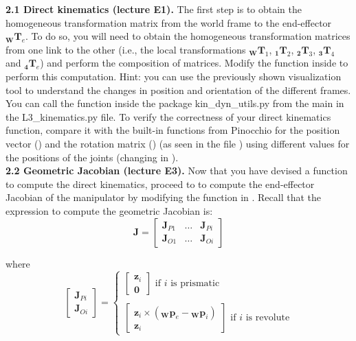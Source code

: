 \documentclass[11pt]{article}
\newcommand{\prepos}[3]{${}_{\mathbf{#2}}{\mathbf{#1}}_{#3}$}
\newcommand{\preposm}[3]{{}_{\mathbf{#2}}{\mathbf{#1}}_{#3}}
\begin{document}
\textbf{2.1 Direct kinematics (lecture E1).} The first step is to obtain the homogeneous transformation matrix from the world frame to the end-effector \prepos{T}{W}{e}. To do so, you will need to obtain the homogeneous transformation matrices from one link to the other (i.e., the local transformations \prepos{T}{W}{1}, \prepos{T}{1}{2}, \prepos{T}{2}{3}, \prepos{T}{3}{4} and \prepos{T}{4}{e}) and perform the composition of matrices. Modify the function  inside  to perform this computation. Hint: you can use the previously shown visualization tool to understand the changes in position and orientation of the different frames. You can call the function inside the package kin\_dyn\_utils.py from the main in the L3\_kinematics.py file. To verify the correctness of your direct kinematics function, compare it with the built-in functions from Pinocchio for the position vector () and the rotation matrix () (as seen in the file ) using different values for the positions of the joints (changing  in ).\\




\textbf{2.2 Geometric Jacobian (lecture E3).} Now that you have devised a function to compute the direct kinematics, proceed to to compute the end-effector Jacobian of the manipulator by modifying the function  in . Recall that the expression to compute the geometric Jacobian is:
\begin{equation*}
	\mathbf{J} = \begin{bmatrix}
		\mathbf{J}_{P1} & \dots & \mathbf{J}_{Pi} \\
		\mathbf{J}_{O1} & \dots & \mathbf{J}_{Oi}
	\end{bmatrix}
\end{equation*}

where
\begin{equation*}
	\begin{bmatrix}
		\mathbf{J}_{Pi}\\
		\mathbf{J}_{Oi}
	\end{bmatrix} = 
	\begin{cases}
		\begin{bmatrix}
			\mathbf{z}_i \\
			\mathbf{0}
		\end{bmatrix} \text{   if $i$ is prismatic} \\
		\\
		\begin{bmatrix}
			\mathbf{z}_i \times (\preposm{p}{W}{e} - \preposm{p}{W}{i}) \\
			\mathbf{z}_i
		\end{bmatrix}\text{   if $i$ is revolute}
	\end{cases}
\end{equation*}
\end{document}

